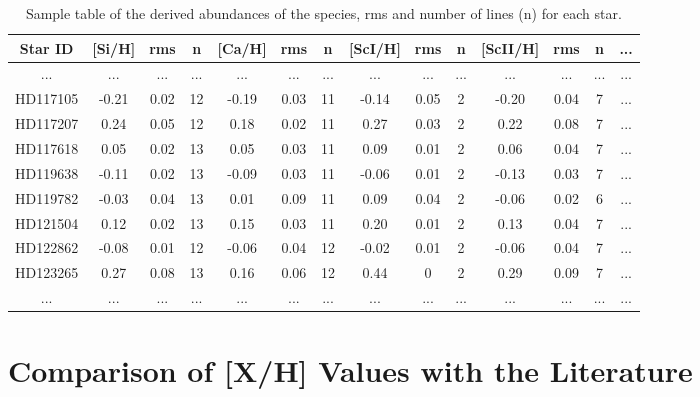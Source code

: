 \documentclass[dvips,12pt,a4paper]{report}
\begin{document}
{{%

\begin{table}[h]\scriptsize
\centering
\caption[Sample table of the abundance derived for the species]{Sample table of the derived abundances of the species, rms and number of lines (n) for each star.}
  \label{abundance_table}
  \begin{tabular}{ c | c c c | c c c | c c c | c c c c }
  \hline
  \hline
Star ID & [Si/H] & rms & n & [Ca/H] & rms & n & [ScI/H] & rms & n & [ScII/H] & rms & n & ...\\
\hline
... & ... & ... & ... & ... & ... & ... & ... & ... & ... & ... & ... & ... & ...\\
HD117105 & -0.21 & 0.02 & 12 & -0.19 & 0.03 & 11 & -0.14 & 0.05 & 2 & -0.20 & 0.04 & 7 & ... \\
HD117207 & 0.24 & 0.05 & 12 & 0.18 & 0.02 & 11 & 0.27 & 0.03 & 2 & 0.22 & 0.08 & 7 & ... \\
HD117618 & 0.05 & 0.02 & 13 & 0.05 & 0.03 & 11 & 0.09 & 0.01 & 2 & 0.06 & 0.04 & 7 & ... \\
HD119638 & -0.11 & 0.02 & 13 & -0.09 & 0.03 & 11 & -0.06 & 0.01 & 2 & -0.13 & 0.03 & 7 & ... \\
HD119782 & -0.03 & 0.04 & 13 & 0.01 & 0.09 & 11 & 0.09 & 0.04 & 2 & -0.06 & 0.02 & 6 & ... \\
HD121504 & 0.12 & 0.02 & 13 & 0.15 & 0.03 & 11 & 0.20 & 0.01 & 2 & 0.13 & 0.04 & 7 & ... \\
HD122862 & -0.08 & 0.01 & 12 & -0.06 & 0.04 & 12 & -0.02 & 0.01 & 2 & -0.06 & 0.04 & 7 & ... \\
HD123265 & 0.27 & 0.08 & 13 & 0.16 & 0.06 & 12 & 0.44 & 0 & 2 & 0.29 & 0.09 & 7 & ... \\
... & ... & ... & ... & ... & ... & ... & ... & ... & ... & ... & ... & ... & ...\\
\hline
\end{tabular}
\end{table}

\section{Comparison of [X/H] Values with the Literature}

}}
\end{document}
